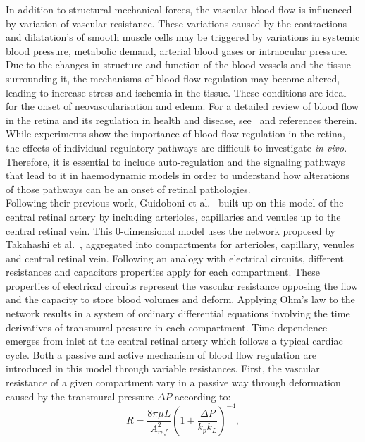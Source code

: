 \documentclass[12pt,a4paper]{article}
\begin{document}
In addition to structural mechanical forces, the vascular blood flow is influenced by variation of vascular resistance.
These variations caused by the contractions and dilatation's of smooth muscle cells may be triggered by variations in systemic blood pressure, metabolic demand, arterial blood gases or intraocular pressure.
Due to the changes in structure and function of the blood vessels and the tissue surrounding it, the mechanisms of blood flow regulation may become altered, leading to increase stress and ischemia in the tissue.
These conditions are ideal for the onset of neovascularisation and edema.
For a detailed review of blood flow in the retina and its regulation in health and disease, see~\cite{Pournaras_2008} and references therein.
While experiments show the importance of blood flow regulation in the retina, the effects of individual regulatory pathways are difficult to investigate \textit{in vivo}. 
Therefore, it is essential to include auto-regulation and the signaling pathways that lead to it in haemodynamic models in order to understand how alterations of those pathways can be an onset of retinal pathologies.\\
Following their previous work, Guidoboni et al.~\cite{Guidoboni_2014b} built up on this model of the central retinal artery by including arterioles, capillaries and venules up to the central retinal vein.
This 0-dimensional model uses the network proposed by Takahashi et al.~\cite{Takahashi_2009}, aggregated into compartments for arterioles, capillary, venules and central retinal vein.
Following an analogy with electrical circuits, different resistances and capacitors properties apply for each compartment.
These properties of electrical circuits represent the vascular resistance opposing the flow and the capacity to store blood volumes and deform.
Applying Ohm's law to the network results in a system of ordinary differential equations involving the time derivatives of transmural pressure in each compartment.
Time dependence emerges from inlet at the central retinal artery which follows a typical cardiac cycle.
Both a passive and active mechanism of blood flow regulation are introduced in this model through variable resistances.
First, the vascular resistance of a given compartment vary in a passive way through deformation caused by the transmural pressure $\Delta P$ according to:
\begin{equation*}
  \label{eq:PassiveVariableResistance}
  R = \frac{8\pi\mu L}{A^2_{ref}}\left(1+\frac{\Delta P}{k_pk_L}\right)^{-4},
\end{equation*}
\end{document}
